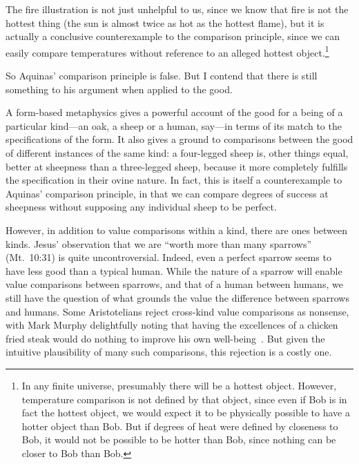 The fire illustration is not just unhelpful to us, since we know that fire is not the hottest thing (the sun is almost
twice as hot as the hottest flame), but it is actually a conclusive counterexample to the comparison principle,
since we can easily compare temperatures without reference to an alleged hottest object.\footnote{In any finite universe,
presumably there will be a hottest object. However, temperature comparison is not defined by that object, since 
even if Bob is in fact the hottest object, we would expect it to be physically possible to have a hotter object 
than Bob. But if degrees of heat were defined by closeness to Bob, it would not be possible to be hotter than
Bob, since nothing can be closer to Bob than Bob.}

So Aquinas' comparison principle is false. But I contend that there is still something to his argument
when applied to the good. 

A form-based metaphysics gives a powerful account of the good for a being of
a particular kind---an oak, a sheep or a human, say---in terms of its match to the specifications of the
form. It also gives a ground to comparisons between the good of different instances of the same kind:
a four-legged sheep is, other things equal, better at sheepness than a three-legged sheep, because it
more completely fulfills the specification in their ovine nature. In fact, this is itself a counterexample 
to Aquinas' comparison principle, in that we can compare degrees of success at sheepness without supposing
any individual sheep to be perfect.

However, in addition to value comparisons within a kind, there are ones between kinds. Jesus' observation
that we are ``worth more than many sparrows'' (Mt.\ 10:31) is quite uncontroversial.
Indeed, even a perfect sparrow seems to have less good than a typical human. While the nature of a sparrow
will enable value comparisons between sparrows, and that of a human between humans, we still have the question
of what grounds the value the difference between sparrows and humans. Some Aristotelians reject cross-kind 
value comparisons as nonsense, with Mark Murphy delightfully noting that having the excellences of a chicken fried
steak would do nothing to improve his own well-being~\parencite[154--155]{MurphyGML}. But given the intuitive plausibility of many such comparisons, this rejection is a costly one.

